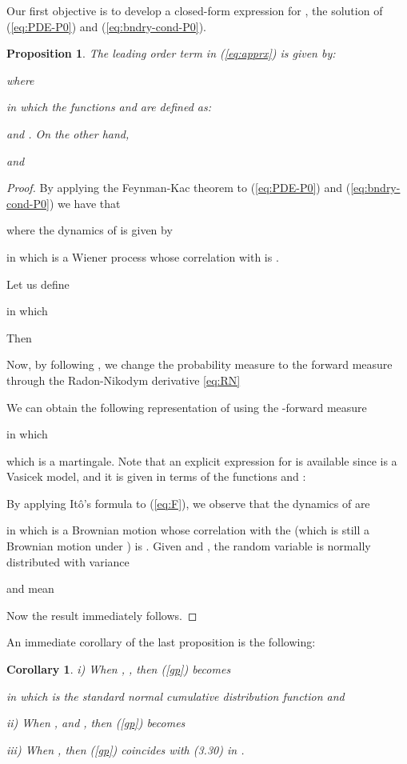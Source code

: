 \documentclass[11pt]{article}
\newtheorem{cor}{Corollary}[section]
\newtheorem{prop}{Proposition}[section]
\numberwithin{equation}{section}
\begin{document}
Our first objective is to develop a closed-form expression for , the solution of (\ref{eq:PDE-P0}) and (\ref{eq:bndry-cond-P0}). 
\begin{prop}
The leading order term  in (\ref{eq:apprx}) is given by:

where

in which the functions  and  are defined as:

and . 
On the other hand,

and 

\end{prop}
\begin{proof}
By applying the Feynman-Kac theorem to (\ref{eq:PDE-P0}) and (\ref{eq:bndry-cond-P0}) we have that 

where the dynamics of  is given by

in which  is a Wiener process whose correlation with  is
.

Let us define

in which

Then 


 Now, by following \cite{geman}, we change the probability measure  to the forward measure  through the Radon-Nikodym derivative \eqref{eq:RN}

We can obtain the following representation of  using the -forward measure

in which 

which is a  martingale.
Note that an explicit expression for  is available since  is a Vasicek model, and it is given in terms of the functions  and :

By  applying It\^{o}'s formula to (\ref{eq:F}), we observe that the dynamics of  are

in which  is a  Brownian motion whose correlation with the  (which is still a Brownian motion under ) is .
Given  and , the random variable
 is normally distributed with
variance

and mean

Now the result immediately follows.
\end{proof}

An immediate corollary of the last proposition is the following:
\begin{cor}\label{cor:p0}
i) When , , then (\ref{gp}) becomes

in which  is the standard normal cumulative distribution
function and


ii) When , and , then  (\ref{gp}) becomes


iii) When , then (\ref{gp}) coincides with (3.30) in \cite{papa}.
\end{cor}
\end{document}
